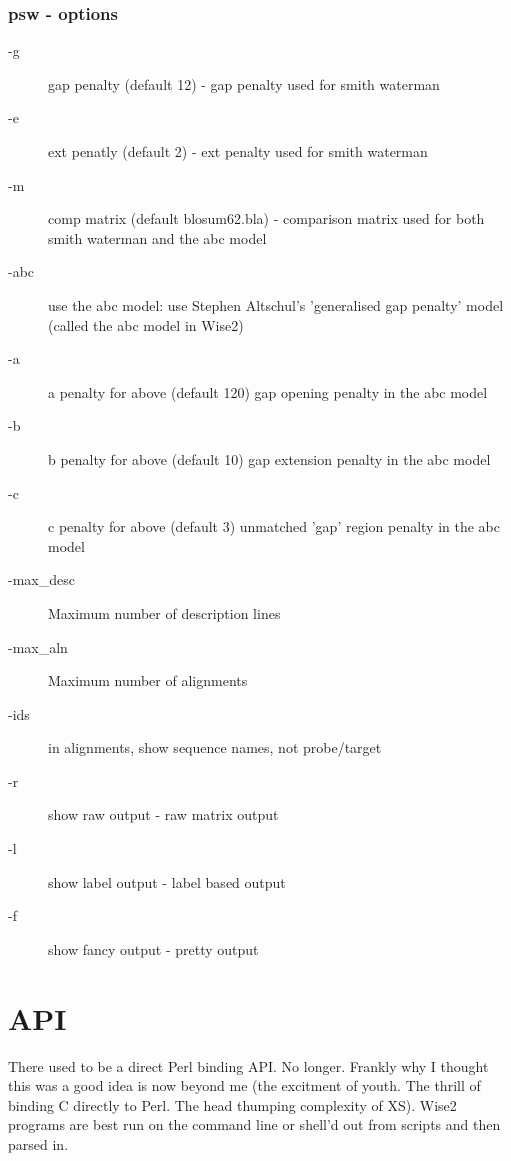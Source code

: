 \documentclass{article}
\begin{document}
\subsubsection{psw - options}
\begin{description}
\item[-g] gap penalty (default 12) - gap penalty used for smith waterman
\item[-e] ext penatly (default 2) - ext penalty used for smith waterman
\item[-m] comp matrix (default blosum62.bla) - comparison matrix used for
both smith waterman and the abc model
\item[-abc] use the abc model: use Stephen Altschul's 'generalised gap penalty'
model (called the abc model in Wise2)
\item[-a]   a penalty for above (default 120) gap opening penalty in the abc model
\item[-b]   b penalty for above (default 10) gap extension penalty in the abc model
\item[-c]   c penalty for above (default 3) unmatched 'gap' region penalty in the abc model
\item[-max\_desc] Maximum number of description lines
\item[-max\_aln] Maximum number of alignments
\item[-ids] in alignments, show sequence names, not probe/target
\item[-r] show raw output - raw matrix output
\item[-l] show label output - label based output
\item[-f] show fancy output - pretty output
\end{description}

\section{API}

There used to be a direct Perl binding API. No longer. Frankly why I thought this
was a good idea is now beyond me (the excitment of youth. The thrill of binding
C directly to Perl. The head thumping complexity of XS). Wise2 programs are best
run on the command line or shell'd out from scripts and then parsed in.
\end{document}
